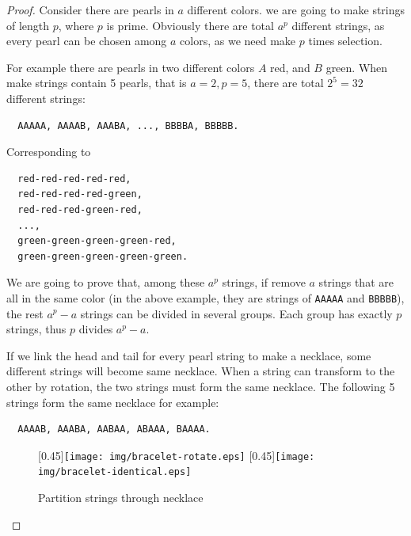 \documentclass{article}
\begin{document}
\begin{proof}
Consider there are pearls in $a$ different colors. we are going to make strings of length $p$, where $p$ is prime. Obviously there are total $a^p$ different strings, as every pearl can be chosen among $a$ colors, as we need make $p$ times selection.

For example there are pearls in two different colors $A$ red, and $B$ green. When make strings contain 5 pearls, that is $a = 2, p = 5$, there are total $2^5 = 32$ different strings:

\begin{verbatim}
  AAAAA, AAAAB, AAABA, ..., BBBBA, BBBBB.
\end{verbatim}

Corresponding to

\begin{verbatim}
  red-red-red-red-red,
  red-red-red-red-green,
  red-red-red-green-red,
  ...,
  green-green-green-green-red,
  green-green-green-green-green.
\end{verbatim}

We are going to prove that, among these $a^p$ strings, if remove $a$ strings that are all in the same color (in the above example, they are strings of \texttt{AAAAA} and \texttt{BBBBB}), the rest $a^p - a$ strings can be divided in several groups. Each group has exactly $p$ strings, thus $p$ divides $a^p - a$.

If we link the head and tail for every pearl string to make a necklace, some different strings will become same necklace. When a string can transform to the other by rotation, the two strings must form the same necklace. The following 5 strings form the same necklace for example:

\begin{verbatim}
  AAAAB, AAABA, AABAA, ABAAA, BAAAA.
\end{verbatim}

\begin{figure}[htbp]
  \centering
  [0.45\linewidth]{\texttt{[image: img/bracelet-rotate.eps]}} \quad
  [0.45\linewidth]{\texttt{[image: img/bracelet-identical.eps]}}
  \caption{Partition strings through necklace}
  \label{fig:bracelet}
\end{figure}


\end{proof}
\end{document}
